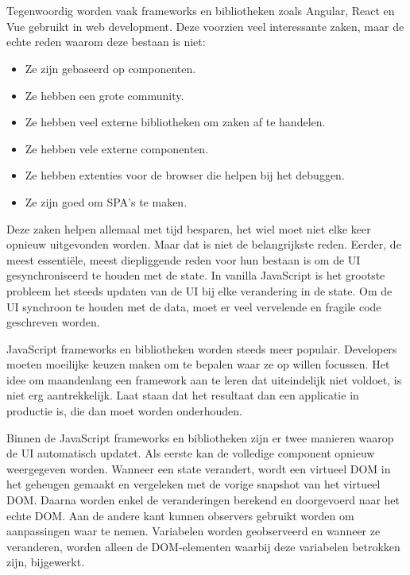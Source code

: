
\chapter{}
\label{ch:inleiding}

Tegenwoordig worden vaak frameworks en bibliotheken zoals Angular, React en Vue gebruikt in web development. Deze voorzien veel interessante zaken, maar de echte reden waarom deze bestaan is niet:
\begin{itemize}
    \item Ze zijn gebaseerd op componenten.
    \item Ze hebben een grote community.
    \item Ze hebben veel externe bibliotheken om zaken af te handelen.
    \item Ze hebben vele externe componenten.
    \item Ze hebben extenties voor de browser die helpen bij het debuggen.
    \item Ze zijn goed om SPA's te maken.
\end{itemize}
Deze zaken helpen allemaal met tijd besparen, het wiel moet niet elke keer opnieuw uitgevonden worden. Maar dat is niet de belangrijkste reden. Eerder, de meest essentiële, meest diepliggende reden voor hun bestaan is om de UI gesynchroniseerd te houden met de state. In vanilla JavaScript is het grootste probleem het steeds updaten van de UI bij elke verandering in de state. Om de UI synchroon te houden met de data, moet er veel vervelende en fragile code geschreven worden. \autocite{Gimeno2018}

JavaScript frameworks en bibliotheken worden steeds meer populair. Developers moeten moeilijke keuzen maken om te bepalen waar ze op willen focussen. Het idee om maandenlang een framework aan te leren dat uiteindelijk niet voldoet, is niet erg aantrekkelijk. Laat staan dat het resultaat dan een applicatie in productie is, die dan moet worden onderhouden. \autocite{Hannah2015}



Binnen de JavaScript frameworks en bibliotheken zijn er twee manieren waarop de UI automatisch updatet. Als eerste kan de volledige component opnieuw weergegeven worden. Wanneer een state verandert, wordt een virtueel DOM in het geheugen gemaakt en vergeleken met de vorige snapshot van het virtueel DOM. Daarna worden enkel de veranderingen berekend en doorgevoerd naar het echte DOM. Aan de andere kant kunnen observers gebruikt worden om aanpassingen waar te nemen. Variabelen worden geobserveerd en wanneer ze veranderen, worden alleen de DOM-elementen waarbij deze variabelen betrokken zijn, bijgewerkt. \autocite{Gimeno2018}

